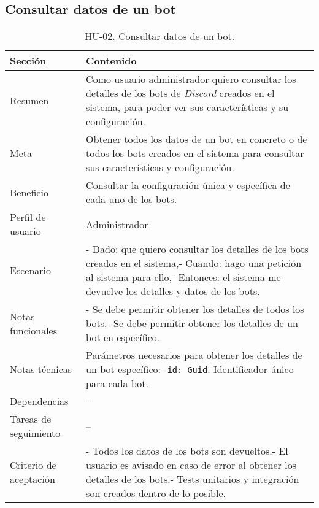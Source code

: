 \subsection{Consultar datos de un bot}

\begin{table}[H]
    \centering
    \def\arraystretch{1.25}
    \begin{adjustbox}{max width=\textwidth}
    \begin{tabularx}{\textwidth}{l|L}
    \hline
        \textbf{Sección} & \textbf{Contenido} \\ \hline
    \hline
        Resumen & Como usuario administrador quiero consultar los detalles de los bots de \textit{Discord} creados en el sistema, para poder ver sus características y su configuración. \\ \hline
        Meta & Obtener todos los datos de un bot en concreto o de todos los bots creados en el sistema para consultar sus características y configuración. \\ \hline
        Beneficio & Consultar la configuración única y específica de cada uno de los bots. \\ \hline
        Perfil de usuario & \hyperref[sec:personaAdmin]{Administrador} \\ \hline
        Escenario & - Dado: que quiero consultar los detalles de los bots creados en el sistema,\linebreak - Cuando: hago una petición al sistema para ello,\linebreak - Entonces: el sistema me devuelve los detalles y datos de los bots. \\ \hline
        Notas funcionales & - Se debe permitir obtener los detalles de todos los bots.\linebreak - Se debe permitir obtener los detalles de un bot en específico. \\ \hline
        Notas técnicas & Parámetros necesarios para obtener los detalles de un bot específico:\linebreak - \verb|id: Guid|. Identificador único para cada bot. \\ \hline
        Dependencias & – \\ \hline
        Tareas de seguimiento & – \\ \hline
        Criterio de aceptación & - Todos los datos de los bots son devueltos.\linebreak - El usuario es avisado en caso de error al obtener los detalles de los bots.\linebreak - Tests unitarios y integración son creados dentro de lo posible. \\ \hline
    \end{tabularx}
    \end{adjustbox}
    \caption{HU-02. Consultar datos de un bot.}
\end{table}

